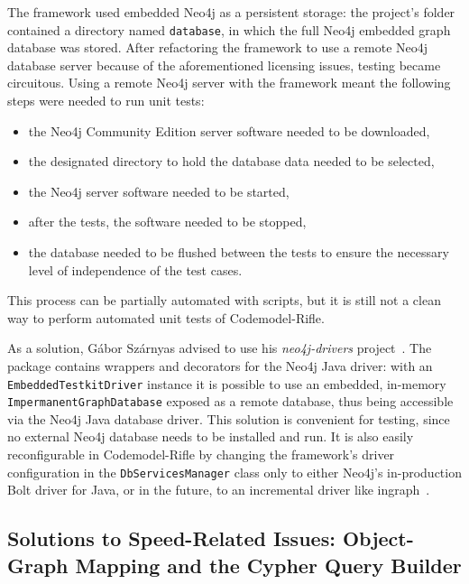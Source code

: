 The framework used embedded Neo4j as a persistent storage: the project's folder contained a directory named \texttt{database}, in which the full Neo4j embedded graph database was stored. After refactoring the framework to use a remote Neo4j database server because of the aforementioned licensing issues, testing became circuitous. Using a remote Neo4j server with the framework meant the following steps were needed to run unit tests:

\begin{itemize}
\item the Neo4j Community Edition server software needed to be downloaded,
\item the designated directory to hold the database data needed to be selected,
\item the Neo4j server software needed to be started,
\item after the tests, the software needed to be stopped,
\item the database needed to be flushed between the tests to ensure the necessary level of independence of the test cases.
\end{itemize}

This process can be partially automated with scripts, but it is still not a clean way to perform automated unit tests of Codemodel-Rifle.

As a solution, Gábor Szárnyas advised to use his \emph{neo4j-drivers} project~\cite{neo4j-drivers}. The package contains wrappers and decorators for the Neo4j Java driver: with an \texttt{EmbeddedTestkitDriver} instance it is possible to use an embedded, in-memory \texttt{ImpermanentGraphDatabase} exposed as a remote database, thus being accessible via the Neo4j Java database driver. This solution is convenient for testing, since no external Neo4j database needs to be installed and run. It is also easily reconfigurable in Codemodel-Rifle by changing the framework's driver configuration in the \texttt{DbServicesManager} class only to either Neo4j's in-production Bolt driver for Java, or in the future, to an incremental driver like ingraph~\cite{ingraph-github}.


\subsection{Solutions to Speed-Related Issues: Object-Graph Mapping and the Cypher Query Builder}

